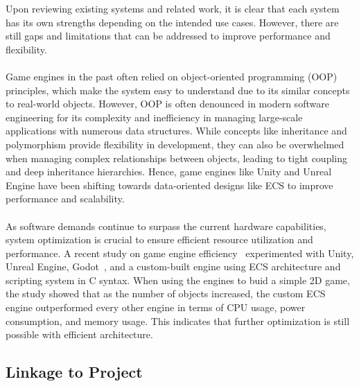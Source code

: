 Upon reviewing existing systems and related work, it is clear that each system has its own strengths depending
on the intended use cases.
However, there are still gaps and limitations that can be addressed to improve performance and flexibility.
\\\\
Game engines in the past often relied on object-oriented programming (OOP) principles, which make the system easy to 
understand due to its similar concepts to real-world objects.
However, OOP is often denounced in modern software engineering for its complexity and inefficiency in managing 
large-scale applications with numerous data structures.
While concepts like inheritance and polymorphism provide flexibility in development, they can also be overwhelmed 
when managing complex relationships between objects, leading to tight coupling and deep inheritance hierarchies.
Hence, game engines like Unity and Unreal Engine have been shifting towards data-oriented designs like ECS to improve 
performance and scalability.
\\\\
As software demands continue to surpass the current hardware capabilities, system optimization is crucial to ensure 
efficient resource utilization and performance.
A recent study on game engine efficiency~\cite{Game_Engine_Efficiency} experimented with Unity, Unreal Engine, 
Godot~\cite{Godot_Engine}, and a custom-built engine using ECS architecture and scripting system in C syntax.
When using the engines to buid a simple 2D game, the study showed that as the number of objects increased, the custom 
ECS engine outperformed every other engine in terms of CPU usage, power consumption, and memory usage.
This indicates that further optimization is still possible with efficient architecture.

\subsection{Linkage to Project}
\label{subsec:linkage-to-project}

